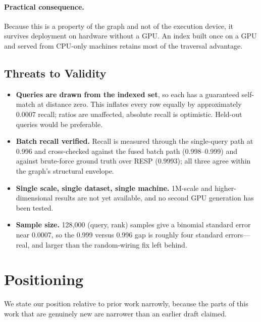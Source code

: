 \documentclass[11pt,twocolumn]{article}
\begin{document}
\paragraph{Practical consequence.} Because this is a property of the graph and
not of the execution device, it survives deployment on hardware without a GPU.
An index built once on a GPU and served from CPU-only machines retains most of
the traversal advantage.

\subsection{Threats to Validity}
\label{sec:threats}

\begin{itemize}[nosep]
    \item \textbf{Queries are drawn from the indexed set}, so each has a
    guaranteed self-match at distance zero. This inflates every row equally by
    approximately 0.0007 recall; ratios are unaffected, absolute recall is
    optimistic. Held-out queries would be preferable.
    \item \textbf{Batch recall verified.} Recall is measured through the
    single-query path at 0.996 and cross-checked against the fused batch path
    (0.998--0.999) and against brute-force ground truth over RESP (0.9993);
    all three agree within the graph's structural envelope.
    \item \textbf{Single scale, single dataset, single machine.} 1M-scale and
    higher-dimensional results are not yet available, and no second GPU
    generation has been tested.
    \item \textbf{Sample size.} 128{,}000 (query, rank) samples give a binomial
    standard error near 0.0007, so the 0.999 versus 0.996 gap is roughly four
    standard errors---real, and larger than the random-wiring fix left behind.
\end{itemize}

\section{Positioning}
\label{sec:novelty}

We state our position relative to prior work narrowly, because the parts of this
work that are genuinely new are narrower than an earlier draft claimed.
\end{document}
